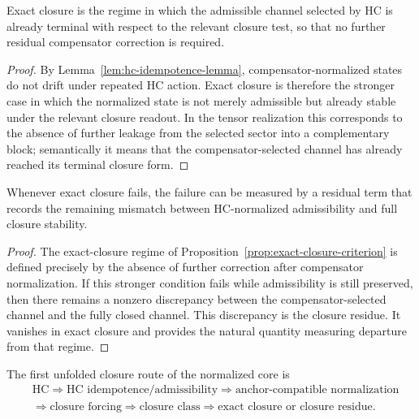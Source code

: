 \begin{proposition}
\label{prop:exact-closure-criterion}
Exact closure is the regime in which the admissible channel selected by HC is
already terminal with respect to the relevant closure test, so that no further
residual compensator correction is required.
\end{proposition}

\begin{proof}
By Lemma~\ref{lem:hc-idempotence-lemma}, compensator-normalized states do not
drift under repeated HC action. Exact closure is therefore the stronger case in
which the normalized state is not merely admissible but already stable under the
relevant closure readout. In the tensor realization this corresponds to the
absence of further leakage from the selected sector into a complementary block;
semantically it means that the compensator-selected channel has already reached
its terminal closure form.
\end{proof}

\begin{lemma}
\label{lem:closure-residue-lemma}
Whenever exact closure fails, the failure can be measured by a residual term
that records the remaining mismatch between HC-normalized admissibility and full
closure stability.
\end{lemma}

\begin{proof}
The exact-closure regime of
Proposition~\ref{prop:exact-closure-criterion} is defined precisely by the
absence of further correction after compensator normalization. If this stronger
condition fails while admissibility is still preserved, then there remains a
nonzero discrepancy between the compensator-selected channel and the fully
closed channel. This discrepancy is the closure residue. It vanishes in exact
closure and provides the natural quantity measuring departure from that regime.
\end{proof}

\begin{corollary}
\label{cor:first-closure-forcing-chain}
The first unfolded closure route of the normalized core is
\[
\begin{aligned}
&\mathrm{HC} \Longrightarrow \text{HC idempotence/admissibility} \Longrightarrow \text{anchor-compatible normalization}\\
&\Longrightarrow \text{closure forcing} \Longrightarrow \text{closure class} \Longrightarrow \text{exact closure or closure residue}.
\end{aligned}
\]
\end{corollary}

